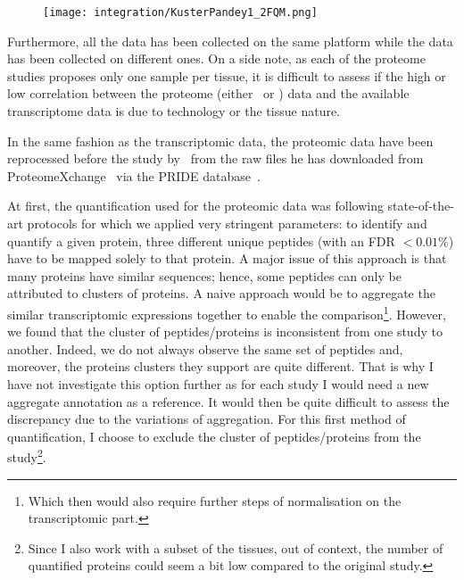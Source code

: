 \begin{figure}[!htbp]
    \texttt{[image: integration/KusterPandey1\_2FQM.png]}\centering
    \caption[Distribution of proteins across the
    tissues]{\label{fig:KusterPandeyFQM}\figKustPandFQM}
\end{figure}

Furthermore, all the  data has been
collected on the same platform while the  data has been
collected on different ones.
On a side note,
as each of the proteome studies proposes only one sample per tissue,
it is difficult to assess if the high or low correlation
between the proteome (either \pandey\ or \kuster) data and
the available transcriptome data is due to technology or the tissue nature.

In the same fashion as the transcriptomic data,
the proteomic data have been reprocessed before the study
by \james\ from the raw files he has downloaded
from ProteomeXchange~
via the PRIDE database~.

At first, the quantification used for the proteomic data was following
state-of-the-art protocols for which we applied very stringent parameters:
to identify and quantify a given protein, three different unique peptides
(with an \gls{FDR} $< 0.01 \%$) have to be mapped solely to that protein.
A major issue of this approach is that many proteins have similar sequences;
hence, some peptides can only be attributed to clusters of proteins.
A naive approach would
be to aggregate the similar transcriptomic expressions together to enable
the comparison\footnote{Which then would also require further steps of
normalisation on the transcriptomic part.}. However, we found that the cluster
of peptides/proteins is inconsistent from one study to another. Indeed, we do
not always observe the same set of peptides and, moreover, the proteins clusters
they support are quite different. That is why I have not investigate this option
further as for each study I would need a new aggregate annotation as a reference.
It would then be quite difficult to assess the discrepancy due to the
variations of aggregation. For this first method of quantification, I choose to
exclude the cluster of peptides/proteins from the study\footnote{Since I also work
with a subset of the tissues, out of context, the number of quantified proteins
could seem a bit low compared to the original study.}.


